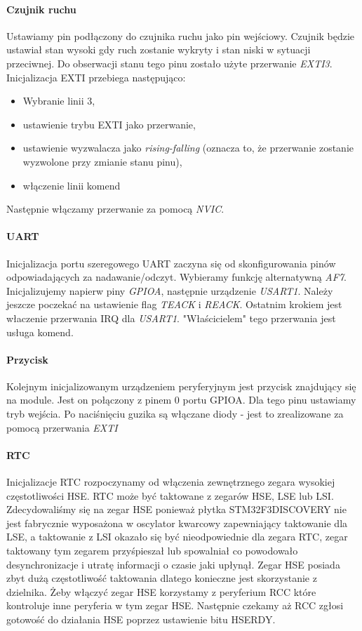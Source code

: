 \documentclass{article}
\begin{document}
\paragraph{Czujnik ruchu}
Ustawiamy pin podłączony do czujnika ruchu jako pin wejściowy. Czujnik będzie ustawiał
stan wysoki gdy ruch zostanie wykryty i stan niski w sytuacji przeciwnej.
Do obserwacji stanu tego pinu zostało użyte przerwanie \emph{EXTI3}.
Inicjalizacja EXTI przebiega następująco:

\begin{itemize}
    \item Wybranie linii 3,
    \item ustawienie trybu EXTI jako przerwanie,
    \item ustawienie wyzwalacza jako \emph{rising-falling}
        (oznacza to, że przerwanie zostanie wyzwolone przy zmianie stanu pinu),
    \item włączenie linii komend
\end{itemize}
Następnie włączamy przerwanie za pomocą \emph{NVIC}.

\paragraph{UART}
Inicjalizacja portu szeregowego UART zaczyna się od skonfigurowania pinów
odpowiadających za nadawanie/odczyt. Wybieramy funkcję alternatywną \emph{AF7}.
Inicjalizujemy napierw piny \emph{GPIOA}, następnie urządzenie \emph{USART1}.
Należy jeszcze poczekać na ustawienie flag \emph{TEACK} i \emph{REACK}. Ostatnim krokiem
jest właczenie przerwania IRQ dla \emph{USART1}. "Właścicielem" tego przerwania jest usługa komend.


\paragraph{Przycisk}
Kolejnym inicjalizowanym urządzeniem peryferyjnym jest przycisk znajdujący
się na module. Jest on połączony z pinem 0 portu GPIOA. Dla tego pinu ustawiamy tryb
wejścia. Po naciśnięciu guzika są włączane diody - jest to zrealizowane za pomocą przerwania \emph{EXTI}

\paragraph{RTC}
Inicjalizacje RTC rozpoczynamy od włączenia zewnętrznego zegara wysokiej częstotliwości HSE.
RTC może być taktowane z zegarów HSE, LSE lub LSI. Zdecydowaliśmy się na zegar HSE ponieważ
płytka STM32F3DISCOVERY nie jest fabrycznie wyposażona w oscylator kwarcowy zapewniający
taktowanie dla LSE, a taktowanie z LSI okazało się być nieodpowiednie dla zegara RTC, zegar
taktowany tym zegarem przyśpieszał lub spowalniał co powodowało desynchronizacje i utratę informacji
o czasie jaki upłynął. Zegar HSE posiada zbyt dużą częstotliwość taktowania dlatego konieczne jest
skorzystanie z dzielnika.
Żeby włączyć zegar HSE korzystamy z peryferium RCC które kontroluje inne peryferia w tym zegar
HSE.
Następnie czekamy aż RCC zgłosi gotowość do działania HSE poprzez ustawienie bitu HSERDY.
\end{document}
